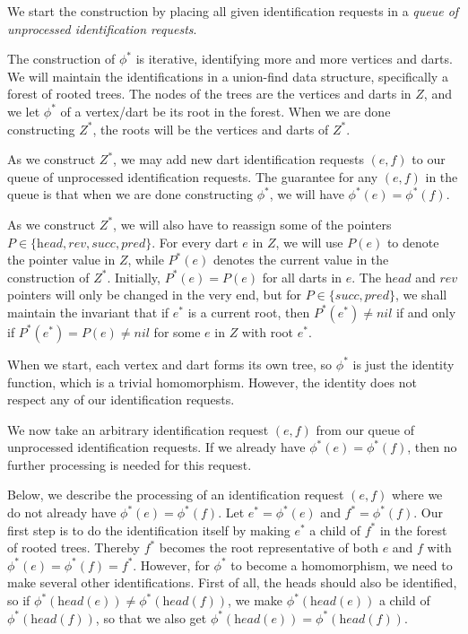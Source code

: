 \documentclass[10pt,a4paper]{article}
\def\nil{\textit{nil}}
\def\head{\textit{head}}
\def\reverse{\textit{rev}}
\def\successor{\textit{succ}}
\def\predecessor{\textit{pred}}
\newcommand\drop[1]{}
\begin{document}
We start the construction by placing all given identification requests in a \emph{queue of unprocessed identification requests}.

The construction of $\phi^*$ is
iterative, identifying more
and more vertices and darts. We will maintain the identifications in a union-find data structure, specifically a forest of rooted trees. The nodes of the trees are the vertices and darts in $Z$, and we
let $\phi^*$ of a vertex/dart be its root in the forest. 
When we are done constructing $Z^*$, the roots will be the vertices and darts of $Z^*$.

As we construct $Z^*$, we may add new
dart identification requests $(e,f)$ to our queue of unprocessed identification requests. The guarantee for any $(e,f)$ in the queue is that when we are done constructing $\phi^*$, we will have $\phi^*(e)=\phi^*(f)$.

\drop{As we start to identify vertices and darts, it may for a while be  unclear which dart we are talking about if we just write $xy$. Instead, as in our dart representation, we think a bit more formally
of a dart $e$ as an object with the above mentioned pointers $\head(e)$, $\reverse(e)$, $\successor(e)$, and $\predecessor(e)$.}

As we construct $Z^*$, we will also have to reassign some of the pointers $P\in\{\head,\reverse,\successor,\predecessor\}$.
For every dart $e$ in $Z$, we will use $P(e)$ to denote the pointer value in $Z$,
while $P^*(e)$ denotes the current value in the construction of $Z^*$. Initially, $P^*(e)=P(e)$ for all darts in $e$. 
The $\head$ and $\reverse$ pointers will only be changed in the very end, but for $P\in\{\successor,\predecessor\}$,  we shall maintain the invariant that if $e^*$ is a current root, then $P^*(e^*)\neq\nil$ if and only if $P^*(e^*)=P(e)\neq\nil$
for some $e$ in $Z$
with root $e^*$.

When we start, each vertex and dart forms its own tree, so $\phi^*$ is just the identity function, which is a trivial homomorphism. However, the identity does not respect any of our identification requests.


We now take an arbitrary identification request $(e,f)$ from our queue of unprocessed identification requests.
If we already have $\phi^*(e)=\phi^*(f)$, then no further processing is needed for this request. 

Below, we describe the processing of an identification request $(e,f)$ where we do not already have $\phi^*(e)=\phi^*(f)$. Let $e^*=\phi^*(e)$ and $f^*=\phi^*(f)$.
Our first step is to
do the identification
itself by making $e^*$ a child of $f^*$ 
in the forest of rooted trees.
Thereby $f^*$ becomes the root representative of both $e$ and $f$ with $\phi^*(e)=\phi^*(f)
=f^*$. However, for $\phi^*$ to become a homomorphism, we need to make several other identifications.
First of all, the heads should also be identified, so if $\phi^*(\head(e)) \neq \phi^*(\head(f))$, we make $\phi^*(\head(e))$ a child of $\phi^*(\head(f))$, so that we also get
$\phi^*(\head(e))=\phi^*(\head(f))$.
\end{document}
